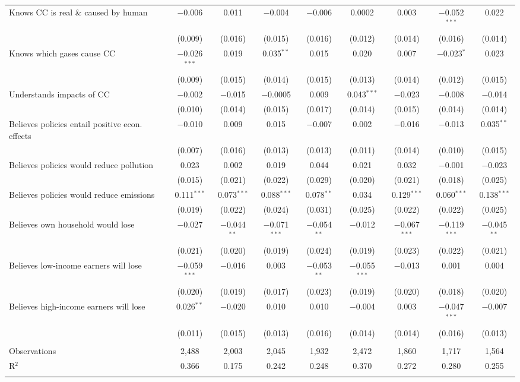 \begin{tabular}{@{\extracolsep{5pt}}lcccccccc}
  Knows CC is real \& caused by human & $-$0.006 & 0.011 & $-$0.004 & $-$0.006 & 0.0002 & 0.003 & $-$0.052$^{***}$ & 0.022 \\ 
  & (0.009) & (0.016) & (0.015) & (0.016) & (0.012) & (0.014) & (0.016) & (0.014) \\ 
  Knows which gases cause CC & $-$0.026$^{***}$ & 0.019 & 0.035$^{**}$ & 0.015 & 0.020 & 0.007 & $-$0.023$^{*}$ & 0.023 \\ 
  & (0.009) & (0.015) & (0.014) & (0.015) & (0.013) & (0.014) & (0.012) & (0.015) \\ 
  Understands impacts of CC & $-$0.002 & $-$0.015 & $-$0.0005 & 0.009 & 0.043$^{***}$ & $-$0.023 & $-$0.008 & $-$0.014 \\ 
  & (0.010) & (0.014) & (0.015) & (0.017) & (0.014) & (0.015) & (0.014) & (0.014) \\ 
  Believes policies entail positive econ. effects & $-$0.010 & 0.009 & 0.015 & $-$0.007 & 0.002 & $-$0.016 & $-$0.013 & 0.035$^{**}$ \\ 
  & (0.007) & (0.016) & (0.013) & (0.013) & (0.011) & (0.014) & (0.010) & (0.015) \\ 
  Believes policies would reduce pollution & 0.023 & 0.002 & 0.019 & 0.044 & 0.021 & 0.032 & $-$0.001 & $-$0.023 \\ 
  & (0.015) & (0.021) & (0.022) & (0.029) & (0.020) & (0.021) & (0.018) & (0.025) \\ 
  Believes policies would reduce emissions & 0.111$^{***}$ & 0.073$^{***}$ & 0.088$^{***}$ & 0.078$^{**}$ & 0.034 & 0.129$^{***}$ & 0.060$^{***}$ & 0.138$^{***}$ \\ 
  & (0.019) & (0.022) & (0.024) & (0.031) & (0.025) & (0.022) & (0.022) & (0.025) \\ 
  Believes own household would lose & $-$0.027 & $-$0.044$^{**}$ & $-$0.071$^{***}$ & $-$0.054$^{**}$ & $-$0.012 & $-$0.067$^{***}$ & $-$0.119$^{***}$ & $-$0.045$^{**}$ \\ 
  & (0.021) & (0.020) & (0.019) & (0.024) & (0.019) & (0.023) & (0.022) & (0.021) \\ 
  Believes low-income earners will lose & $-$0.059$^{***}$ & $-$0.016 & 0.003 & $-$0.053$^{**}$ & $-$0.055$^{***}$ & $-$0.013 & 0.001 & 0.004 \\ 
  & (0.020) & (0.019) & (0.017) & (0.023) & (0.019) & (0.020) & (0.018) & (0.020) \\ 
  Believes high-income earners will lose & 0.026$^{**}$ & $-$0.020 & 0.010 & 0.010 & $-$0.004 & 0.003 & $-$0.047$^{***}$ & $-$0.007 \\ 
  & (0.011) & (0.015) & (0.013) & (0.016) & (0.014) & (0.014) & (0.016) & (0.013) \\ 
 \hline \\[-1.8ex] 

Observations & 2,488 & 2,003 & 2,045 & 1,932 & 2,472 & 1,860 & 1,717 & 1,564 \\ 
R$^{2}$ & 0.366 & 0.175 & 0.242 & 0.248 & 0.370 & 0.272 & 0.280 & 0.255 \\ 
\hline 
\hline \\[-1.8ex] 
\end{tabular} 
